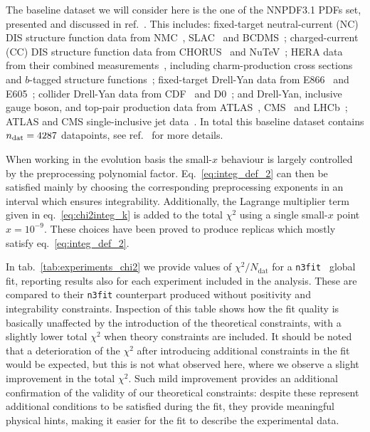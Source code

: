 %
The baseline dataset we will consider here is the one of the NNPDF3.1 PDFs set, presented and discussed in ref.~\cite{Ball:2017nwa}.
This includes: fixed-target neutral-current 
(NC) DIS structure function data from NMC~\cite{Arneodo:1996kd,Arneodo:1996qe}, 
SLAC~\cite{Whitlow:1991uw} and BCDMS~\cite{Benvenuti:1989rh}; charged-current 
(CC) DIS structure function data from CHORUS~\cite{Onengut:2005kv} and 
NuTeV~\cite{Goncharov:2001qe,Mason:2006qa}; HERA data from their combined 
measurements~\cite{Abramowicz:2015mha}, including charm-production cross 
sections~\cite{Abramowicz:1900rp} and $b$-tagged structure 
functions~\cite{Aaron:2009af,Abramowicz:2014zub}; fixed-target Drell-Yan data 
from E866~\cite{Webb:2003ps,Webb:2003bj,Towell:2001nh} and 
E605~\cite{Moreno:1990sf}; collider Drell-Yan data from 
CDF~\cite{Aaltonen:2010zza} and D0~\cite{Abazov:2007jy,
Abazov:2013rja,D0:2014kma}; and Drell-Yan, inclusive gauge boson, and top-pair
production data from 
ATLAS~\cite{Aad:2013iua,Aad:2014qja,Aad:2011dm,Aaboud:2016btc,Aad:2015auj,
Aad:2014kva,Aaboud:2016pbd,Aad:2015mbv}, CMS~\cite{Chatrchyan:2012xt,
Chatrchyan:2013mza,Chatrchyan:2013tia,Khachatryan:2016pev,Khachatryan:2015oaa,
Khachatryan:2016mqs,Khachatryan:2015uqb,Khachatryan:2015oqa} 
and LHCb~\cite{Aaij:2012vn,Aaij:2012mda,Aaij:2015gna,Aaij:2015zlq};
ATLAS and CMS single-inclusive jet data~\cite{Aad:2014vwa, Khachatryan:2015luy}.
In total this baseline dataset contains $n_{\rm dat}=4287$
datapoints, see ref.~\cite{Ball:2017nwa} for more details.

%
When working in the evolution basis the small-$x$ behaviour is largely controlled by the preprocessing
polynomial factor. Eq.~\eqref{eq:integ_def_2}
can then be satisfied mainly by choosing the corresponding preprocessing exponents in an interval which ensures integrability.
Additionally, the Lagrange multiplier term given in eq.~\eqref{eq:chi2integ_k} is added to the
total $\chi^2$ using a single small-$x$ point $x=10^{-9}$. These choices have been proved to
produce replicas which mostly satisfy eq.~\eqref{eq:integ_def_2}. 

%
In tab.~\ref{tab:experiments_chi2} we provide values of $\chi^2/N_{\text{dat}}$ for a {\tt n3fit } global fit,
reporting results also for each experiment included in the analysis.
These are compared to their {\tt n3fit} counterpart produced without positivity and integrability constraints. 
Inspection of this table shows how the fit quality is basically unaffected by the introduction of the
theoretical constraints, with a slightly lower total $\chi^2$ when theory constraints are included.
It should be noted that a deterioration of the $\chi^2$ after introducing additional constraints in the fit would be expected,
but this is not what observed here, where we observe a slight improvement in the total $\chi^2$. 
Such mild improvement provides an additional confirmation of the validity of our theoretical constraints: 
despite these represent additional conditions to be satisfied during the fit, 
they provide meaningful physical hints, making it easier for the fit to describe the experimental data. 
 
